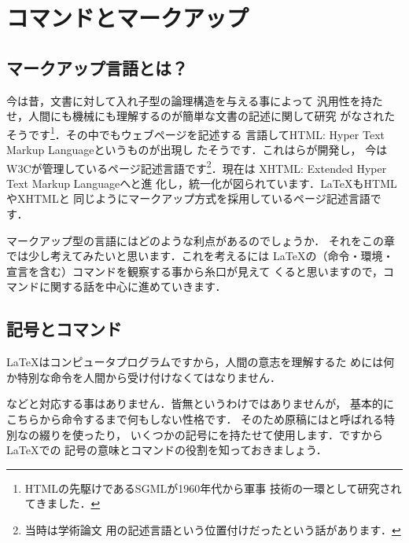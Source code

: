 \chapter{コマンドとマークアップ}

\begin{abstract}
マークアップ言語とは何なのか，マークアップで何が実現できるのか，
それを{\LaTeX}でどのように実現するのかという基本的な部分を紹介します．
\end{abstract}


\section{マークアップ言語とは？}
今は昔，文書に対して入れ子型の論理構造を与える事によって
汎用性を持たせ，人間にも機械にも理解するのが簡単な文書の記述に関して研究
がなされたそうです\footnote{HTMLの先駆けであるSGMLが1960年代から軍事
技術の一環として研究されてきました．}．その中でもウェブページを記述する
言語してHTML: Hyper Text Markup Languageというものが出現し
たそうです．これはらが開発し，
今はW3Cが管理しているページ記述言語です\footnote{当時は学術論文
用の記述言語という位置付けだったという話があります．}．現在は
XHTML: Extended Hyper Text Markup Languageへと進
化し，統一化が図られています．{\LaTeX}もHTMLやXHTMLと
同じようにマークアップ方式を採用しているページ記述言語です．

マークアップ型の言語にはどのような利点があるのでしょうか．
それをこの章では少し考えてみたいと思います．これを考えるには
\LaTeX の（命令・環境・宣言を含む）コマンドを観察する事から糸口が見えて
くると思いますので，コマンドに関する話を中心に進めていきます．

\section{記号とコマンド}
{\LaTeX}はコンピュータプログラムですから，人間の意志を理解するた
めには何か特別な命令を人間から受け付けなくてはなりません．
\begin{quote}
\end{quote}
などと対応する事はありません．皆無というわけではありませんが，
基本的にこちらから命令するまで何もしない性格です．
そのため原稿にはと呼ばれる特別なの綴りを使ったり，
いくつかの記号にを持たせて使用します．ですから{\LaTeX}での
記号の意味とコマンドの役割を知っておきましょう．


